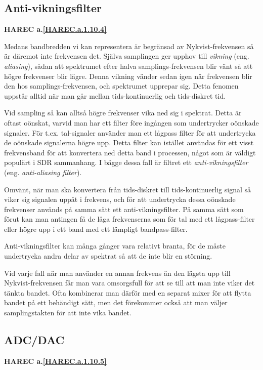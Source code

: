 \subsection{Anti-vikningsfilter}
\textbf{HAREC a.\ref{HAREC.a.1.10.4}\label{myHAREC.a.1.10.4}}

Medans bandbredden vi kan representera är begränsad av Nykvist-frekvensen så
är däremot inte frekvensen det. Själva samplingen ger upphov till
\emph{vikning} (eng. \emph{aliasing}),
sådan att spektrumet efter halva samplings-frekvensen blir vänt så att högre
frekvenser blir lägre. Denna vikning vänder sedan igen när frekvensen blir
den hos samplings-frekvensen, och spektrumet upprepar sig. Detta fenomen
uppstår alltid när man går mellan tids-kontinuerlig och tids-diskret tid.


Vid sampling så kan alltså högre frekvenser vika ned sig i spektrat. Detta är
oftast oönskat, varvid man har ett filter före ingången som undertrycker
oönskade signaler. För t.ex. tal-signaler använder man ett lågpass filter för
att undertrycka de oönskade signalerna högre upp. Detta filter kan istället
användas för ett visst frekvensband för att konvertera ned detta band i
processen, något som är väldigt populärt i SDR sammanhang. I bägge dessa fall
är filtret ett \emph{anti-vikningsfilter} (eng. \emph{anti-aliasing filter}).

Omvänt, när man ska konvertera från tids-diskret till tids-kontinuerlig
signal så viker sig signalen uppåt i frekvens, och för att undertrycka dessa
oönskade frekvenser används på samma sätt ett anti-vikningsfilter. På samma
sätt som förut kan man antingen få de låga frekvenserna som för tal med ett
lågpass-filter eller högre upp i ett band med ett lämpligt bandpass-filter.

Anti-vikningsfilter kan många gånger vara relativt branta, för de måste
undertrycka andra delar av spektrat så att de inte blir en störning.

Vid varje fall när man använder en annan frekvens än den lägsta upp till
Nykvist-frekvensen får man vara omsorgsfull för att se till att man inte viker
det tänkta bandet. Ofta kombinerar man därför med en separat mixer för att
flytta bandet på ett behändigt sätt, men det förekommer också att man väljer
samplingstakten för att inte vika bandet.

\subsection{ADC/DAC}
\textbf{HAREC a.\ref{HAREC.a.1.10.5}\label{myHAREC.a.1.10.5}}

